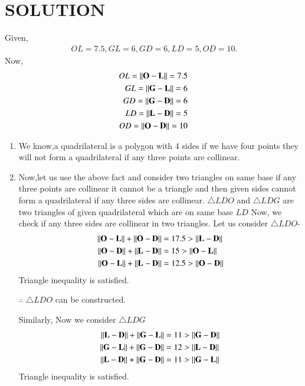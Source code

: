 \documentclass[journal,12pt,twocolumn]{IEEEtran}
\begin{document}
\section{SOLUTION}
 Given,
\begin{align}
\ OL = 7.5, GL = 6, GD = 6, LD = 5, OD = 10 .
\end{align}
Now,
\begin{align}
OL=\left\lVert\mathbf{O}-\mathbf{L}\right\rVert = 7.5
 \\
GL=\left\lVert\mathbf{G}-\mathbf{L}\right\rVert = 6
 \\
GD=\left\lVert\mathbf{G}-\mathbf{D}\right\rVert = 6
 \\
LD=\left\lVert\mathbf{L}-\mathbf{D}\right\rVert = 5
 \\
OD=\left\lVert\mathbf{O}-\mathbf{D}\right\rVert = 10
\end{align}
\begin{enumerate}
\item We know,a quadrilateral is a polygon with 4 sides if we have four points they will not form a quadrilateral if any three points are collinear. 
\item Now,let us use the above fact and consider two triangles on same base if any three points are collinear it cannot be a triangle and then given sides cannot form a quadrilateral if any three sides are collinear.
$\triangle LDO$ and $\triangle LDG$ are two triangles of given quadrilateral which are on same base $LD$ 
Now, we check if any three sides are collinear in two triangles.
Let us consider $\triangle LDO$-
\begin{align}
\left\lVert\mathbf{O}-\mathbf{L}\right\rVert+\left\lVert\mathbf{O}-\mathbf{D}\right\rVert&=17.5> \left\lVert\mathbf{L}-\mathbf{D}\right\rVert\\
\left\lVert\mathbf{O}-\mathbf{D}\right\rVert+\left\lVert\mathbf{L}-\mathbf{D}\right\rVert&=15>\left\lVert\mathbf{O}-\mathbf{L}\right\rVert\\
\left\lVert\mathbf{O}-\mathbf{L}\right\rVert+\left\lVert\mathbf{L}-\mathbf{D}\right\rVert&=12.5>\left\lVert\mathbf{O}-\mathbf{D}\right\rVert
\end{align}
Triangle inequality is satisfied.

$\therefore$ $\triangle LDO$ can be constructed.

Similarly, Now we consider $\triangle LDG$
\begin{align}
\left\lVert\mathbf{L}-\mathbf{D}\right\rVert + \left\lVert\mathbf{G}-\mathbf{L}\right\rVert&=11 > \left\lVert\mathbf{G}-\mathbf{D}\right\rVert
\\
\left\lVert\mathbf{G}-\mathbf{L}\right\rVert + \left\lVert\mathbf{G}-\mathbf{D}\right\rVert&=12 > \left\lVert\mathbf{L}-\mathbf{D}\right\rVert
\\
\left\lVert\mathbf{L}-\mathbf{D}\right\rVert + \left\lVert\mathbf{G}-\mathbf{D}\right\rVert&=11 > \left\lVert\mathbf{G}-\mathbf{L}\right\rVert
\end{align}
Triangle inequality is satisfied.


\end{enumerate}
\end{document}
